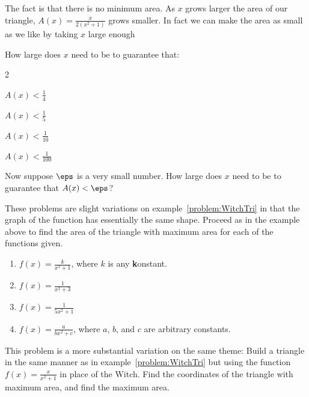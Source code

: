 \begin{ProblemSection}
\begin{embeddedproblem}{}
    
    The fact is that there is no minimum area. As $x$ grows larger the
    area of our triangle, $A(x) = \frac{x}{2(x^2+1)}$ grows smaller. In
    fact we can make the area as small as we like by taking $x$ large
    enough

    How large does $x$ need to be to guarantee that:
    \begin{enumerate}[label={\bf{}(\alph*)}]
      \begin{multicols}{2}
      \item $A(x)<\frac14$
      \item $A(x)<\frac{1}{5}$
      \item $A(x)<\frac{1}{10}$
      \item $A(x)<\frac{1}{100}$
      \item Now suppose $\eps$ is a very small number. How large does $x$
        need to be to guarantee that $A(x)<\eps$?
      \end{multicols}
    \end{enumerate}


  \end{embeddedproblem}

  \begin{embeddedproblem}{}
    These problems are slight variations on
    example~\ref{problem:WitchTri} in that the graph of the function
    has essentially the same shape.  Proceed as in the example above
    to find the area of the triangle with maximum area for each of the
    functions given.
    \begin{enumerate}[label={\bf{}(\alph*)}]{}
    \item $f(x) = \frac{k}{x^2+1}$, where $k$ is any {\bf{}k}onstant.
    \item $f(x) = \frac{1}{x^2+3}$
    \item $f(x) = \frac{1}{5x^2+1}$
    \item $f(x) = \frac{a}{bx^2+c}$, where $a$, $b$, and $c$ are
      arbitrary constants.
    \end{enumerate}
  \end{embeddedproblem}

  \begin{embeddedproblem}{}
    This problem is a more substantial variation on the same theme:
    Build a triangle in the same manner as in
    example~\ref{problem:WitchTri} but using the function
    $f(x)=\frac{x}{x^2+1}$ in place of the Witch. Find the coordinates
    of the triangle with maximum area, and find the maximum area.
  \end{embeddedproblem}


\end{ProblemSection}
